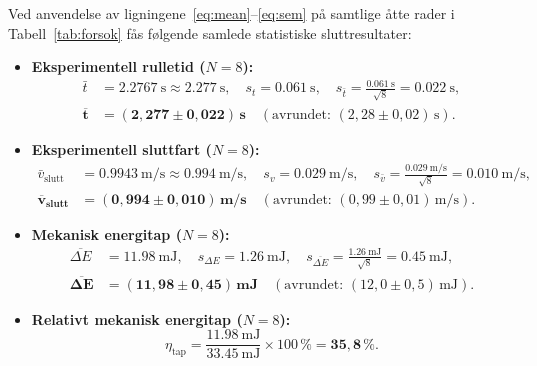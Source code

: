\documentclass[11pt,a4paper]{article}
\begin{document}
Ved anvendelse av ligningene~\eqref{eq:mean}--\eqref{eq:sem} på samtlige åtte rader i Tabell~\ref{tab:forsok} fås følgende samlede statistiske sluttresultater:
\begin{itemize}
    \item \textbf{Eksperimentell rulletid ($N=8$):}
    \begin{align*}
        \bar{t} &= \SI{2,2767}{\second} \approx \SI{2,277}{\second}, \quad s_t = \SI{0,061}{\second}, \quad s_{\bar{t}} = \frac{\SI{0,061}{\second}}{\sqrt{8}} = \SI{0,022}{\second}, \\
        \mathbf{\overline{t}} &= \mathbf{(2{,}277 \pm 0{,}022)\,\si{\second}} \quad (\text{avrundet: } (2{,}28 \pm 0{,}02)\,\si{\second}).
    \end{align*}
    \item \textbf{Eksperimentell sluttfart ($N=8$):}
    \begin{align*}
        \bar{v}_{\text{slutt}} &= \SI{0,9943}{\meter\per\second} \approx \SI{0,994}{\meter\per\second}, \quad s_v = \SI{0,029}{\meter\per\second}, \quad s_{\bar{v}} = \frac{\SI{0,029}{\meter\per\second}}{\sqrt{8}} = \SI{0,010}{\meter\per\second}, \\
        \mathbf{\overline{v}_{\text{slutt}}} &= \mathbf{(0{,}994 \pm 0{,}010)\,\si{\meter\per\second}} \quad (\text{avrundet: } (0{,}99 \pm 0{,}01)\,\si{\meter\per\second}).
    \end{align*}
    \item \textbf{Mekanisk energitap ($N=8$):}
    \begin{align*}
        \overline{\Delta E} &= \SI{11,98}{\milli\joule}, \quad s_{\Delta E} = \SI{1,26}{\milli\joule}, \quad s_{\overline{\Delta E}} = \frac{\SI{1,26}{\milli\joule}}{\sqrt{8}} = \SI{0,45}{\milli\joule}, \\
        \mathbf{\overline{\Delta E}} &= \mathbf{(11{,}98 \pm 0{,}45)\,\si{\milli\joule}} \quad (\text{avrundet: } (12{,}0 \pm 0{,}5)\,\si{\milli\joule}).
    \end{align*}
    \item \textbf{Relativt mekanisk energitap ($N=8$):}
    \begin{equation*}
        \eta_{\text{tap}} = \frac{\SI{11,98}{\milli\joule}}{\SI{33,45}{\milli\joule}} \times 100\,\% = \mathbf{35{,}8\,\%}.
    \end{equation*}
\end{itemize}
\end{document}
